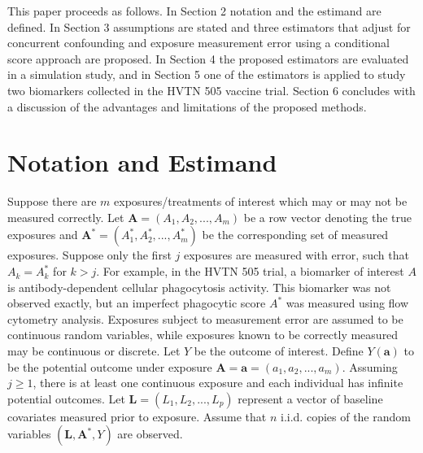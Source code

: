 \documentclass[useAMS,usenatbib,referee]{biom}
\begin{document}
This paper proceeds as follows. In Section 2 notation and the estimand are defined. In Section 3 assumptions are stated and three estimators that adjust for concurrent confounding and exposure measurement error using a conditional score approach are proposed. In Section 4 the proposed estimators are evaluated in a simulation study, and in Section 5 one of the estimators is applied to study two biomarkers collected in the HVTN 505 vaccine trial. Section 6 concludes with a discussion of the advantages and limitations of the proposed methods.

\section{Notation and Estimand}
\label{s:notation}

Suppose there are $m$ exposures/treatments of interest which may or may not be measured correctly. Let $\bm{A} = (A_{1}, A_{2}, ..., A_{m})$ be a row vector denoting the true exposures and $\bm{A}^{*} =  (A^{*}_{1}, A^{*}_{2}, ..., A^{*}_{m})$ be the corresponding set of measured exposures. Suppose only the first $j$ exposures are measured with error, such that $A_{k} = A^{*}_{k}$ for $k > j$. For example, in the HVTN 505 trial, a biomarker of interest $A$ is antibody-dependent cellular phagocytosis activity. This biomarker was not observed exactly, but an imperfect phagocytic score $A^{*}$ was measured using flow cytometry analysis. Exposures subject to measurement error are assumed to be continuous random variables, while exposures known to be correctly measured may be continuous or discrete. Let $Y$ be the outcome of interest. Define $Y(\bm{a})$ to be the potential outcome under exposure $\bm{A} = \bm{a} = (a_{1}, a_{2}, ..., a_{m})$. Assuming $j \geq 1$, there is at least one continuous exposure and each individual has infinite potential outcomes. Let $\bm{L} =  (L_{1}, L_{2}, ..., L_{p})$ represent a vector of baseline covariates measured prior to exposure. Assume that $n$ i.i.d. copies of the random variables $(\bm{L}, \bm{A}^{*}, Y)$ are observed.
\end{document}
